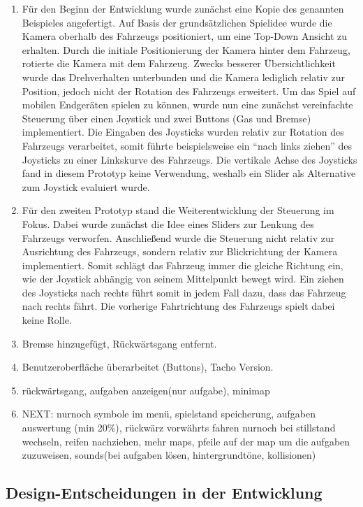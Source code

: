 	\begin{enumerate}[label=Prototyp \arabic*]
		\item{ Für den Beginn der Entwicklung wurde zunächst eine Kopie des genannten Beispieles angefertigt. Auf Basis der grundsätzlichen Spielidee wurde die Kamera oberhalb des Fahrzeugs positioniert, um eine Top-Down Ansicht zu erhalten. Durch die initiale Positionierung der Kamera hinter dem Fahrzeug, rotierte die Kamera mit dem Fahrzeug. Zwecks besserer Übersichtlichkeit wurde das Drehverhalten unterbunden und die Kamera lediglich relativ zur Position, jedoch nicht der Rotation des Fahrzeugs erweitert. Um das Spiel auf mobilen Endgeräten spielen zu können, wurde nun eine zunächst vereinfachte Steuerung über einen Joystick und zwei Buttons (Gas und Bremse) implementiert. Die Eingaben des Joysticks wurden relativ zur Rotation des Fahrzeugs verarbeitet, somit führte beispielsweise ein \enquote{nach links ziehen} des Joysticks zu einer Linkskurve des Fahrzeugs. Die vertikale Achse des Joysticks fand in diesem Prototyp keine Verwendung, weshalb ein Slider als Alternative zum Joystick evaluiert wurde. }
		\item{ Für den zweiten Prototyp stand die Weiterentwicklung der Steuerung im Fokus. Dabei wurde zunächst die Idee eines Sliders zur Lenkung des Fahrzeugs verworfen. Anschließend wurde die Steuerung nicht relativ zur Ausrichtung des Fahrzeugs, sondern relativ zur Blickrichtung der Kamera implementiert. Somit schlägt das Fahrzeug immer die gleiche Richtung ein, wie der Joystick abhängig von seinem Mittelpunkt bewegt wird. Ein ziehen des Joysticks nach rechts führt somit in jedem Fall dazu, dass das Fahrzeug nach rechts fährt. Die vorherige Fahrtrichtung des Fahrzeugs spielt dabei keine Rolle. }
		\item{ Bremse hinzugefügt, Rückwärtsgang entfernt. }
		\item{ Benutzeroberfläche überarbeitet (Buttons), Tacho Version. }
		\item{ rückwärtsgang, aufgaben anzeigen(nur aufgabe), minimap }
		\item{NEXT: nurnoch symbole im menü, spielstand speicherung, aufgaben auswertung (min 20\%), rückwärz vorwährts fahren nurnoch bei stillstand wechseln, reifen nachziehen, mehr maps, pfeile auf der map um die aufgaben zuzuweisen, sounds(bei aufgaben lösen, hintergrundtöne, kollisionen) }
	\end{enumerate}
\subsection{Design-Entscheidungen in der Entwicklung}
